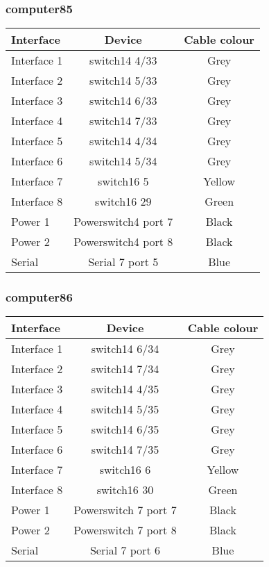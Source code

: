 \subsubsection{computer85}

\begin{table}[H]
\begin{tabular}{|l|c|c|}\hline
Interface & Device & Cable colour \\ \hline
Interface 1 & switch14 4/33 & Grey \\
Interface 2 & switch14 5/33 & Grey \\
Interface 3 & switch14 6/33 & Grey \\
Interface 4 & switch14 7/33 & Grey \\
Interface 5 & switch14 4/34 & Grey \\
Interface 6 & switch14 5/34 & Grey \\
Interface 7 & switch16 5 & Yellow \\
Interface 8 & switch16 29 & Green \\
Power 1 & Powerswitch4 port 7 & Black \\
Power 2 & Powerswitch4 port 8 & Black \\
Serial & Serial 7 port 5 & Blue \\ \hline
\end{tabular}
\end{table}

\subsubsection{computer86}

\begin{table}[H]
\begin{tabular}{|l|c|c|}\hline
Interface & Device & Cable colour \\ \hline
Interface 1 & switch14 6/34 & Grey \\
Interface 2 & switch14 7/34 & Grey \\
Interface 3 & switch14 4/35 & Grey \\
Interface 4 & switch14 5/35 & Grey \\
Interface 5 & switch14 6/35 & Grey \\
Interface 6 & switch14 7/35 & Grey \\
Interface 7 & switch16 6 & Yellow \\
Interface 8 & switch16 30 & Green \\
Power 1 & Powerswitch 7 port 7 & Black \\
Power 2 & Powerswitch 7 port 8 & Black \\
Serial & Serial 7 port 6 & Blue \\ \hline
\end{tabular}
\end{table}

